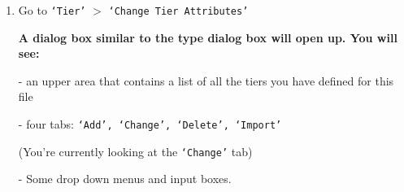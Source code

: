 \documentclass[letterpaper,12pt]{article}
\begin{document}
\begin{enumerate}
\item Go to \texttt{`Tier'} $>$ \texttt{`Change Tier Attributes'}
\end{enumerate}

\begin{itemize}
\setlength{\itemindent}{9pt}
\item[] \textbf{A dialog box similar to the type dialog box will open up. You will see:}
\item[-] an upper area that contains a list of all the tiers you have defined for this file
\item[-] four tabs: \texttt{`Add', `Change', `Delete', `Import'}
\item[] (You're currently looking at the \texttt{`Change'} tab)
\item[-] Some drop down menus and input boxes.
\end{itemize}
\vspace{6pt}
\end{document}
